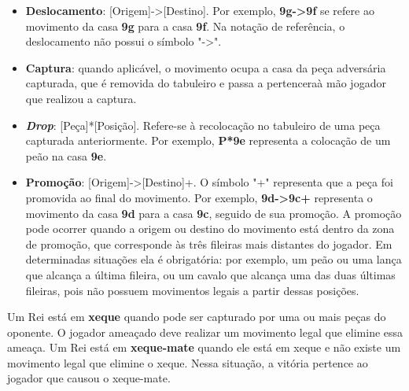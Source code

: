		\begin{itemize}
			\item \textbf{Deslocamento}: [Origem]->[Destino]. Por exemplo, \textbf{9g->9f} se refere ao movimento da casa \textbf{9g} para a casa \textbf{9f}. Na notação de referência, o deslocamento não possui o símbolo "->".
			\item \textbf{Captura}: quando aplicável, o movimento ocupa a casa da peça adversária capturada, que é removida do tabuleiro e passa a pertenceraà mão jogador que realizou a captura.
			\item \textit{\textbf{Drop}}: [Peça]*[Posição]. Refere-se à recolocação no tabuleiro de uma peça capturada anteriormente. Por exemplo, \textbf{P*9e} representa a colocação de um peão na casa \textbf{9e}.
			\item \textbf{Promoção}: [Origem]->[Destino]+. O símbolo "+" representa que a peça foi promovida ao final do movimento. Por exemplo, \textbf{9d->9c+} representa o movimento da casa \textbf{9d} para a casa \textbf{9c}, seguido de sua promoção. A promoção pode ocorrer quando a origem ou destino do movimento está dentro da zona de promoção, que corresponde às três fileiras mais distantes do jogador. Em determinadas situações ela é obrigatória: por exemplo, um peão ou uma lança que alcança a última fileira, ou um cavalo que alcança uma das duas últimas fileiras, pois não possuem movimentos legais a partir dessas posições. 
		\end{itemize}

	Um Rei está em \textbf{xeque} quando pode ser capturado por uma ou mais peças do oponente. O jogador ameaçado deve realizar um movimento legal que elimine essa ameaça.
	Um Rei está em \textbf{xeque-mate} quando ele está em xeque e não existe um movimento legal que elimine o xeque. Nessa situação, a vitória pertence ao jogador que 
	causou o xeque-mate.

